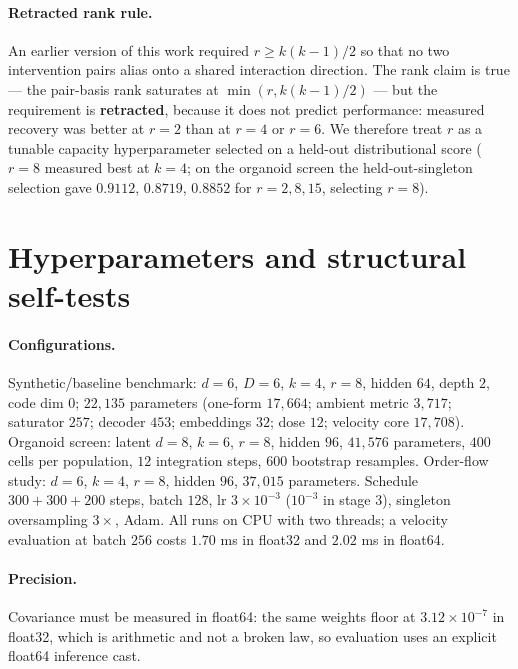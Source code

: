 \documentclass{article}
\begin{document}
\paragraph{Retracted rank rule.} An earlier version of this work required $r \ge k(k-1)/2$ so
that no two intervention pairs alias onto a shared interaction direction. The rank claim is
true --- the pair-basis rank saturates at $\min(r, k(k-1)/2)$ --- but the requirement is
\textbf{retracted}, because it does not predict performance: measured recovery was better at
$r{=}2$ than at $r{=}4$ or $r{=}6$. We therefore treat $r$ as a tunable capacity
hyperparameter selected on a held-out distributional score ($r{=}8$ measured best at
$k{=}4$; on the organoid screen the held-out-singleton selection gave $0.9112$, $0.8719$,
$0.8852$ for $r = 2, 8, 15$, selecting $r{=}8$).

\section{Hyperparameters and structural self-tests}
\label{app:hparams}

\paragraph{Configurations.} Synthetic/baseline benchmark: $d{=}6$, $D{=}6$, $k{=}4$, $r{=}8$,
hidden $64$, depth $2$, code dim $0$; $22{,}135$ parameters (one-form $17{,}664$; ambient
metric $3{,}717$; saturator $257$; decoder $453$; embeddings $32$; dose $12$; velocity core
$17{,}708$). Organoid screen: latent $d{=}8$, $k{=}6$, $r{=}8$, hidden $96$, $41{,}576$
parameters, $400$ cells per population, $12$ integration steps, $600$ bootstrap resamples.
Order-flow study: $d{=}6$, $k{=}4$, $r{=}8$, hidden $96$, $37{,}015$ parameters. Schedule
$300{+}300{+}200$ steps, batch $128$, lr $3\times10^{-3}$ ($10^{-3}$ in stage 3), singleton
oversampling $3\times$, Adam. All runs on CPU with two threads; a velocity evaluation at
batch $256$ costs $1.70$ ms in float32 and $2.02$ ms in float64.

\paragraph{Precision.} Covariance must be measured in float64: the same weights floor at
$3.12\times10^{-7}$ in float32, which is arithmetic and not a broken law, so evaluation uses
an explicit float64 inference cast.
\end{document}
